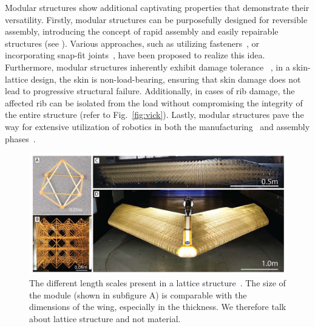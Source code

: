 Modular structures show additional captivating properties that demonstrate their versatility. Firstly, modular structures can be purposefully designed for reversible assembly, introducing the concept of rapid assembly and easily repairable structures (see ). Various approaches, such as utilizing fasteners~, or incorporating snap-fit joints~, have been proposed to realize this idea. Furthermore, modular structures inherently exhibit damage tolerance~ \eg, in a skin-lattice design, the skin is non-load-bearing, ensuring that skin damage does not lead to progressive structural failure. Additionally, in cases of rib damage, the affected rib can be isolated from the load without compromising the integrity of the entire structure (refer to Fig.~\ref{fig:vick}). Lastly, modular structures pave the way for extensive utilization of robotics in both the manufacturing~ and assembly phases~.
\begin{figure}
    \centering
    \includegraphics[width=\linewidth]{figures/02_literature/nasa-madcat-morphing-wing-breakdown-1000-x-600(1).jpg}
    \caption{The different length scales present in a lattice structure~\cite{cramer_elastic_2019}. The size of the module (shown in subfigure A) is comparable with the dimensions of the wing, especially in the thickness. We therefore talk about lattice structure and not material.}
    \label{fig:02_madcat}
\end{figure}

